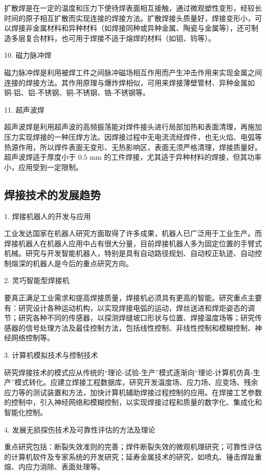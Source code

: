 \documentclass[UTF8]{ctexbook}
\newcommand{\◎}{\ensuremath{\bigcirc}}
\begin{document}
扩散焊是在一定的温度和压力下使待焊表面相互接触，通过微观塑性变形，经较长时间的原子相互扩散而实现连接的焊接方法。扩散焊接头质量好，焊接变形小，可以焊接非金属材料和异种材料（如焊接同种或异种金属、陶瓷与金属等），还可制造多层复合材料，也可用于焊接不适于熔焊的材料（如钼、钨等）。

10. 磁力脉冲焊

磁力脉冲焊是利用被焊工件之间脉冲磁场相互作用而产生冲击作用来实现金属之间连接的焊接方法。其作用原理与爆炸焊相似，可用来焊接薄壁管材、异种金属如铜-铝、铝-不锈钢、铜-不锈钢、锆-不锈钢等。

11. 超声波焊

超声波焊是利用超声波的高频振荡能对焊件接头进行局部加热和表面清理，再施加压力实现焊接的一种压焊方法。因焊接过程中无电流流经焊件，也无火焰、电弧等热源作用，所以焊件表面无变形、无热影响区，表面无须严格清理，焊接质量好。超声波焊适于厚度小于 $0.5\text{ mm}$ 的工件焊接，尤其适于异种材料的焊接，但其功率小，应用受到一定限制。

\subsection{焊接技术的发展趋势}

1. 焊接机器人的开发与应用

工业发达国家在机器人研究方面取得了许多成果，机器人已广泛用于工业生产。而焊接机器人在机器人应用中占有很大分量，目前焊接机器人多为固定位置的手臂式机械。研究与开发智能机器人，特别是具有自动路径规划、自动校正轨迹、自动控制熔深的机器人是今后的重点研究方向。

2. 灵巧智能型焊接机

要真正满足工业需求和提高焊接质量，焊接机必须具有更高的智能。研究重点主要有：研究设计各种运动机构，以实现焊接电弧的运动，焊丝送进和焊炬姿态的调节；研究各种不同的传感器，以探测焊缝坡口形状与位置、焊接温度场等；研究传感器的信号处理方法及最佳控制方法，包括线性控制、非线性控制和模糊控制、神经网络控制等。

3. 计算机模拟技术与控制技术

研究焊接技术的模式应从传统的“理论-试验-生产”模式逐渐向“理论-计算机仿真-生产”模式转化。应建立焊接工程数据库，研究开发温度场、应力场、应变场、残余应力等的测试装置和方法，加快计算机辅助焊接过程控制的应用。在焊接工艺参数的控制中，引入神经网络和模糊控制，以实现焊接过程和质量的数字化、集成化和智能化控制。

4. 发展无损探伤技术及可靠性评估的方法及理论

重点研究包括：断裂失效准则的完善；焊件断裂失效的微观机理研究；可靠性评估的计算机软件及专家系统的开发研究；延寿金属技术的研究，如喷丸、锤击焊趾重熔、内应力消除、表面处理等。
\end{document}
